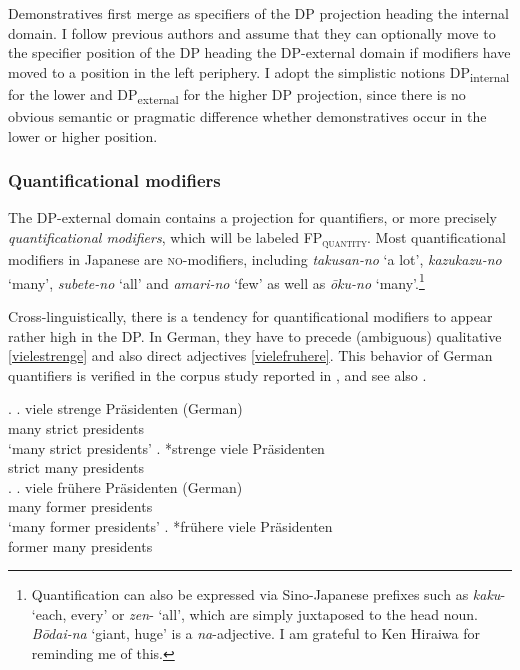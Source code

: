 Demonstratives first merge as specifiers of the DP projection heading the internal domain. I follow previous authors \citep{laenzlinger:2011:elements, kim:2019:syntax} and assume that they can optionally move to the specifier position of the DP heading the DP-external domain if modifiers have moved to a position in the left periphery. I adopt the simplistic notions DP\textsubscript{internal} for the lower and DP\textsubscript{external} for the higher DP projection, since there is no obvious semantic or pragmatic difference whether demonstratives occur in the lower or higher position.

\subsubsection{Quantificational modifiers} \label{quantificational modifiers}

The DP-external domain contains a projection for quantifiers, or more precisely \textit{quantificational modifiers}, which will be labeled FP\textsubscript{\textsc{quantity}}. Most quantificational modifiers in Japanese are \textsc{no}-modifiers, including \textit{takusan-no} `a lot’, \textit{kazukazu-no} `many', \textit{subete-no} `all' and \textit{amari-no} `few' as well as \textit{ōku-no} `many’.\footnote{Quantification can also be expressed via Sino-Japanese prefixes such as \textit{kaku}- `each, every' or \textit{zen}- `all’, which are simply juxtaposed to the head noun. \textit{Bōdai-na} `giant, huge’ is a \textit{na}-adjective. I am grateful to Ken Hiraiwa for reminding me of this.}

Cross-linguistically, there is a tendency for quantificational modifiers to appear rather high in the DP. In  German, they have to precede (ambiguous) qualitative \ref{vielestrenge} and also direct adjectives \ref{vielefruhere}. This behavior of German quantifiers is verified in the corpus study reported in \citet[378]{trost:2006:das}, and see also \citet{eichinger:1991:ganz}.

\ex. \label{vielestrenge}
 \ag. viele strenge Präsidenten (German)\\
many strict presidents\\
`many strict presidents’
\bg. *strenge viele Präsidenten\\
strict many presidents\\


\ex. \label{vielefruhere}
 \ag. viele frühere Präsidenten (German)\\
many former presidents\\
`many former presidents’
\bg. *frühere viele Präsidenten\\
former many presidents\\

